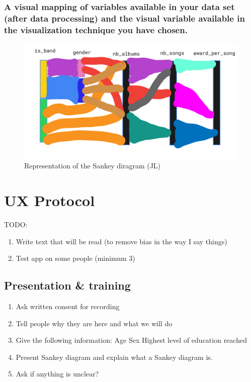 \documentclass[a4paper, 11pt, oneside]{article}
\begin{document}
\subsubsection*{A visual mapping of variables available in your data set (after data processing) and the visual variable available in the visualization technique you have chosen.}

\begin{figure}[H]
    \centering
    \includegraphics[width=.8\textwidth]{Images/sketch_jl.png}
    \caption{Representation of the Sankey diragram (JL)}
\end{figure}

\section{UX Protocol}
TODO:
\begin{enumerate}
    \item Write text that will be read (to remove bias in the way I say things)
    \item Test app on some people (minimum 3)
\end{enumerate}

\subsection{Presentation \& training}
\begin{enumerate}
    \item Ask written consent for recording
    \item Tell people why they are here and what we will do
    \item Give the following information:
          \subitem Age
          \subitem Sex
          \subitem Highest level of education reached
    \item Present Sankey diagram and explain what a Sankey diagram is.
    \item Ask if anything is unclear?
\end{enumerate}
\end{document}
